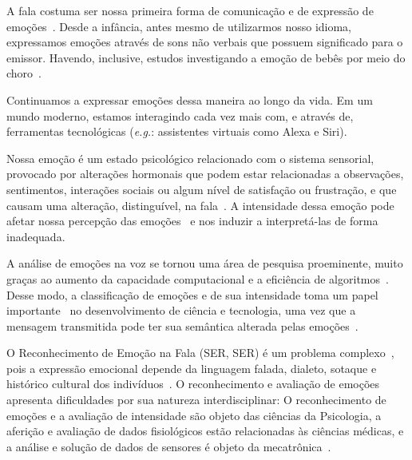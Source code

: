 

A fala costuma ser nossa primeira forma de comunicação e de expressão de emoções~\cite{1.5}. Desde a infância, antes mesmo de utilizarmos nosso idioma, expressamos emoções através de sons não verbais que possuem significado para o emissor. Havendo, inclusive, estudos investigando a emoção de bebês por meio do choro~\cite{0}.

Continuamos a expressar emoções dessa maneira ao longo da vida. Em um mundo moderno, estamos interagindo cada vez mais com, e através de, ferramentas tecnológicas (\textit{e.g.}: assistentes virtuais como Alexa e Siri).

Nossa emoção é um estado psicológico relacionado com o sistema sensorial, provocado por alterações hormonais que podem estar relacionadas a observações, sentimentos, interações sociais ou algum nível de satisfação ou frustração, e que causam uma alteração, distinguível, na fala~\cite{8}. A intensidade dessa emoção pode afetar nossa percepção das emoções~\cite{18.46} e nos induzir a interpretá-las de forma inadequada.

A análise de emoções na voz se tornou uma área de pesquisa proeminente, muito graças ao aumento da capacidade computacional e a eficiência de algoritmos~\cite{38, 20}. Desse modo, a classificação de emoções e de sua intensidade toma um papel importante~\cite{3} no desenvolvimento de ciência e tecnologia, uma vez que a mensagem transmitida pode ter sua semântica alterada pelas emoções~\cite{39}.

O Reconhecimento de Emoção na Fala (\acrlong{SER}, \acrshort{SER}) é um problema complexo~\cite{complexidade1}, pois a expressão emocional depende da linguagem falada, dialeto, sotaque e histórico cultural dos indivíduos~\cite{6}. O reconhecimento e avaliação de emoções apresenta dificuldades por sua natureza interdisciplinar: O reconhecimento de emoções e a avaliação de intensidade são objeto das ciências da Psicologia, a aferição e avaliação de dados fisiológicos estão relacionadas às ciências médicas, e a análise e solução de dados de sensores é objeto da mecatrônica~\cite{17}.

